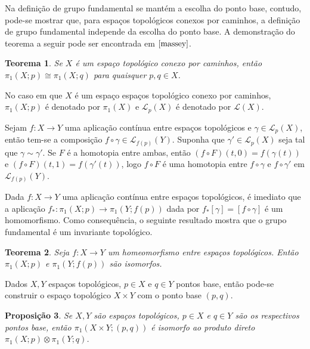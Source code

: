\documentclass[12pt]{book}
\newtheorem{teorema}{Teorema}[section]
\newtheorem{proposicao}[teorema]{Proposição}
\newcommand{\caminhos}{\mathcal{L}}
\newcommand{\caminhossempontobase}[1]{\caminhos(#1)}
\newcommand{\caminhospontobasegeral}[2]{\caminhos_{#1}(#2)}
\newcommand{\classe}[1]{[#1]}
\newcommand{\grupofundamental}[1]{\pi_{1}(#1)}
\newcommand{\grupofundamentalpontobase}[2]{\pi_{1}(#1; #2)}
\begin{document}
	Na definição de grupo fundamental se mantém a escolha do ponto base, contudo, pode-se mostrar que, para espaços topológicos conexos por caminhos, a definição de grupo fundamental independe da escolha do ponto base. A demonstração do teorema a seguir pode ser encontrada em $\cite{massey}$.
	
	\begin{teorema}
		Se $X$ é um espaço topológico conexo por caminhos, então $\grupofundamentalpontobase{X}{p} \cong \grupofundamentalpontobase{X}{q}$ para quaisquer $p,q \in X$.
	\end{teorema}
	
	No caso em que $X$ é um espaço espaços topológico conexo por caminhos, $\grupofundamentalpontobase{X}{p}$ é denotado por $\grupofundamental{X}$ e $\caminhospontobasegeral{p}{X}$ é denotado por $\caminhossempontobase{X}$.
	
	
	Sejam $f:X\to Y$ uma aplicação contínua entre espaços topológicos e $\gamma \in \caminhospontobasegeral{p}{X}$, então tem-se a composição $f\circ \gamma \in \caminhospontobasegeral{f(p)}{Y}$. Suponha que $\gamma' \in \caminhospontobasegeral{p}{X}$ seja tal que $\gamma \sim \gamma'$. Se $F$ é a homotopia entre ambas, então $(f\circ F)(t,0) =  f(\gamma(t))$ e $(f\circ F)(t,1) =  f(\gamma'(t)) $, logo $f\circ F$ é uma homotopia entre $f\circ \gamma$ e $f\circ \gamma'$ em $\caminhospontobasegeral{f(p)}{Y}$.
	
	Dada $f:X\to Y$ uma aplicação contínua entre espaços topológicos, é imediato que a aplicação $f_{*}:\grupofundamentalpontobase{X}{p} \to \grupofundamentalpontobase{Y}{f(p)}$ dada por $f_{*}\classe{\gamma} = \classe{f\circ\gamma}$ é um homomorfismo. Como consequência, o seguinte resultado mostra que o grupo fundamental é um invariante topológico.
	
	\begin{teorema}
		Seja $f:X\to Y$ um homeomorfismo entre espaços topológicos. Então $\grupofundamentalpontobase{X}{p}$ e $\grupofundamentalpontobase{Y}{f(p)}$ são isomorfos.
	\end{teorema}
	
	Dados $X, Y$ espaços topológicos, $p\in X$ e $q\in Y$ pontos base, então pode-se construir o espaço topológico $X\times Y$ com o ponto base $(p,q)$.
	
	\begin{proposicao}\label{proposicao_produto_grupo_fundamental}
		Se $X, Y$ são espaços topológicos, $p\in X$ e $q\in Y$ são os respectivos pontos base, então $\grupofundamentalpontobase{X\times Y}{(p,q)}$ é isomorfo ao produto direto $\grupofundamentalpontobase{X}{p}\otimes \grupofundamentalpontobase{Y}{q}$.
	\end{proposicao}
	
\end{document}
